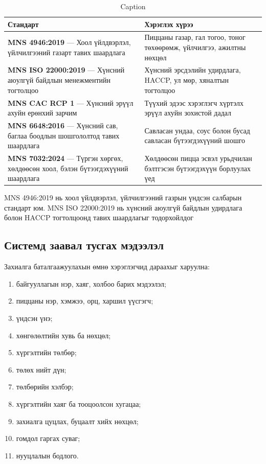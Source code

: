 \begin{table}
    \centering
    \begin{tabular}{p{5cm}p{10cm}}
        \toprule
\textbf{Стандарт} &
\textbf{Хэрэглэх хүрээ} \\
\midrule

\textbf{MNS 4946:2019} --- Хоол үйлдвэрлэл, үйлчилгээний газарт
тавих шаардлага &
Пиццаны газар, гал тогоо, тоног төхөөрөмж, үйлчилгээ, ажилтны нөхцөл \\

\textbf{MNS ISO 22000:2019} --- Хүнсний аюулгүй байдлын менежментийн
тогтолцоо &
Хүнсний эрсдэлийн удирдлага, HACCP, ул мөр, хяналтын тогтолцоо \\

\textbf{MNS CAC RCP 1} --- Хүнсний эрүүл ахуйн ерөнхий зарчим &
Түүхий эдээс хэрэглэгч хүртэлх эрүүл ахуйн зохистой дадал \\

\textbf{MNS 6648:2016} --- Хүнсний сав, баглаа боодлын шошгололтод
тавих шаардлага &
Савласан ундаа, соус болон бусад савласан бүтээгдэхүүний шошго \\

\textbf{MNS 7032:2024} --- Түргэн хөргөх, хөлдөөсөн хоол, бэлэн
бүтээгдэхүүний шаардлага &
Хөлдөөсөн пицца эсвэл урьдчилан бэлтгэсэн бүтээгдэхүүн борлуулах үед \\

\bottomrule
    \end{tabular}
    \caption{Caption}
    \label{tab:placeholder}
\end{table}

MNS 4946:2019 нь хоол үйлдвэрлэл, үйлчилгээний газрын үндсэн салбарын стандарт юм. MNS ISO 22000:2019 нь хүнсний аюулгүй байдлын удирдлага болон HACCP тогтолцоонд тавих шаардлагыг тодорхойлдог

\subsection{Системд заавал тусгах мэдээлэл}

Захиалга баталгаажуулахын өмнө хэрэглэгчид дараахыг харуулна:

\begin{enumerate}
    \item байгууллагын нэр, хаяг, холбоо барих мэдээлэл;
    \item пиццаны нэр, хэмжээ, орц, харшил үүсгэгч;
    \item үндсэн үнэ;
    \item хөнгөлөлтийн хувь ба нөхцөл;
    \item хүргэлтийн төлбөр;
    \item төлөх нийт дүн;
    \item төлбөрийн хэлбэр;
    \item хүргэлтийн хаяг ба тооцоолсон хугацаа;
    \item захиалга цуцлах, буцаалт хийх нөхцөл;
    \item гомдол гаргах суваг;
    \item нууцлалын бодлого.
\end{enumerate}

